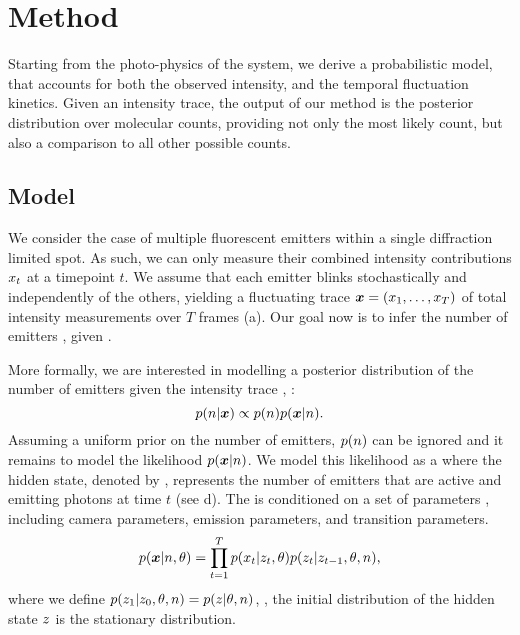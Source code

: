\section{Method}

Starting from the photo-physics of the system, we derive a probabilistic model,
that accounts for both the observed intensity, and the temporal fluctuation
kinetics.
  Given an intensity trace, the output of our method is the posterior
  distribution over molecular counts, providing not only the most likely count,
  but also a comparison to all other possible counts. 

\subsection{Model}

We consider the case of multiple fluorescent emitters within a single
diffraction limited spot.
%
  As such, we can only measure their combined intensity contributions
  $x_{t}$ at a timepoint $t$.
  We assume that each emitter blinks stochastically and independently of the
  others, yielding a fluctuating trace $\bm{x} = (x_{1},\ldots,x_{T})$ of total
  intensity measurements over $T$ frames (a).
  Our goal now is to infer the number of emitters \n, given \trace.

More formally, we are interested in modelling a posterior distribution of the
number of emitters \n given the intensity trace \trace, \ie:
  \begin{equation*}
    p(n | \bm{x}) \propto p(n) p(\bm{x} | n)
    \text{.}
  \end{equation*}
  Assuming a uniform prior on the number of emitters, $p(n)$ can be ignored
  and it remains to model the likelihood $p(\bm{x}|n)$.
  We model this likelihood as a \hmm where the hidden state, denoted by ,
  represents the number of emitters that are active and emitting photons at
  time $t$ (see d).
  The \hmm is conditioned on a set of parameters \parameters, including
    \parametersc camera parameters, \parameterse emission parameters, 
    and \parameterst transition parameters.
  \begin{equation}
    p(\bm{x}| n, \theta) =
      \prod_{t=1}^{T}
        p(x_{t} | z_{t}, \theta)
        p(z_{t} | z_{t-1}, \theta, n)
    \text{,}
    \label{eq:method:HMM}
  \end{equation}
  where we define $p(z_{1}|z_{0},\theta,n)=p(z_{}|\theta,n)$, \ie,
  the initial distribution of the hidden state $z_{}$ is the stationary
  distribution.


